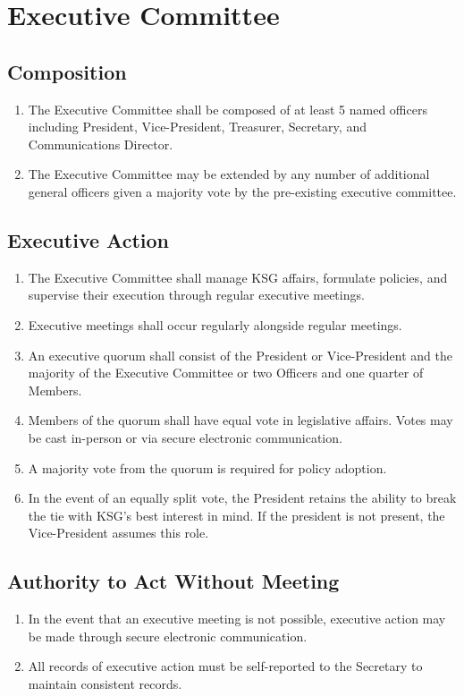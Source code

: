 \documentclass[12pt,executivepaper]{article}
\begin{document}
\section{Executive Committee}

\subsection{Composition}
\begin{enumerate}
    \item The Executive Committee shall be composed of at least 5 named officers including
          President, Vice-President, Treasurer, Secretary, and Communications Director. 
    \item The Executive Committee may be extended by any number of additional general officers
          given a majority vote by the pre-existing executive committee.
\end{enumerate}

\subsection{Executive Action}
\begin{enumerate}
    \item The Executive Committee shall manage KSG affairs, formulate policies, and supervise
          their execution through regular executive meetings.
    \item Executive meetings shall occur regularly alongside regular meetings.
    \item An executive quorum shall consist of the President or Vice-President and the
          majority of the Executive Committee or two Officers and one quarter of Members.
    \item Members of the quorum shall have equal vote in legislative affairs.
          Votes may be cast in-person or via secure electronic communication.
    \item A majority vote from the quorum is required for policy adoption.
    \item In the event of an equally split vote, the President retains the ability to
          break the tie with KSG's best interest in mind. If the president is not present,
          the Vice-President assumes this role.
\end{enumerate}

\subsection{Authority to Act Without Meeting}
\begin{enumerate}
    \item In the event that an executive meeting is not possible, executive action
          may be made through secure electronic communication.
    \item All records of executive action must be self-reported to the Secretary to
          maintain consistent records.
\end{enumerate}
\end{document}
